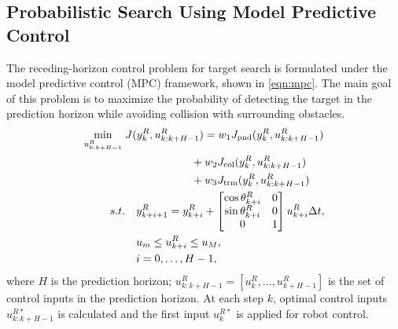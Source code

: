 \documentclass[twocolumn,10pt]{asme2e}
\begin{document}
\subsection*{Probabilistic Search Using Model Predictive Control}
The receding-horizon control problem for target search is formulated under the model predictive control (MPC) framework, shown in \cref{eqn:mpc}. 
The main goal of this problem is to maximize the probability of detecting the target in the prediction horizon while avoiding collision with surrounding obstacles.
\begin{subequations}\label{eqn:mpc}
	\begin{align}
	\min_{u^R_{k:k+H-1}}\; & J(y^R_k,u^R_{k:k+H-1})=w_1J_{\text{pnd}}(y^R_k,u^R_{k:k+H-1})\notag\\&\qquad\qquad\qquad+w_2J_{\text{col}}(y^R_k,u^R_{k:k+H-1})\notag\\&\qquad\qquad\qquad+w_3J_{\text{trm}}(y^R_k,u^R_{k:k+H-1})\label{eqn:mpc_obj}\\
	s.t. &\quad
	y^R_{k+i+1}=y^R_{k+i}+
	\begin{bmatrix}
	\cos{\theta^R_{k+i}} & 0\\
	\sin{\theta^R_{k+i}} & 0\\
	0 & 1
	\end{bmatrix}u^R_{k+i}\Delta t,\\
	&\quad u_m\le u^R_{k+i}\le u_M,\\
	& \quad i=0,\dots,H-1,\notag
	\end{align}
\end{subequations}
where $H$ is the prediction horizon;
$u^R_{k:k+H-1}=[u^R_{k},\dots,u^R_{k+H-1}]$ is the set of control inputs in the prediction horizon.
At each step $k$, optimal control inputs $u^{R*}_{k:k+H-1}$ is calculated and the first input $u^{R*}_{k}$ is applied for robot control.
\end{document}
